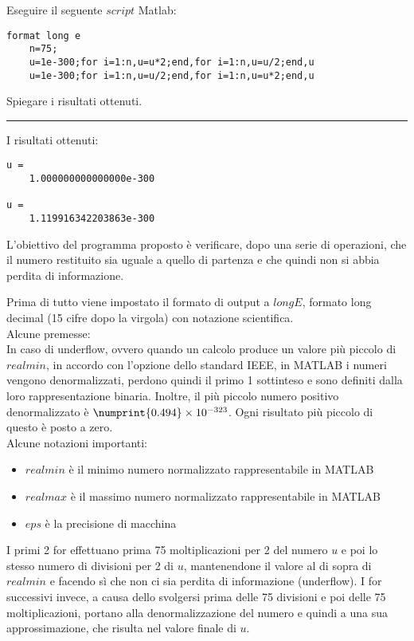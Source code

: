 Eseguire il seguente $script$ Matlab:
\begin{lstlisting}[caption = {}]
	format long e
	n=75;
	u=1e-300;for i=1:n,u=u*2;end,for i=1:n,u=u/2;end,u
	u=1e-300;for i=1:n,u=u/2;end,for i=1:n,u=u*2;end,u
\end{lstlisting}
Spiegare i risultati ottenuti.

\hspace{1cm}
\par\noindent\rule{\textwidth}{0.4pt}
\hspace{1cm}

I risultati ottenuti:
\begin{lstlisting}[caption = {}]
u = 
	1.000000000000000e-300

u = 
	1.119916342203863e-300
\end{lstlisting}

L'obiettivo del programma proposto è verificare, dopo una serie di operazioni, che il numero restituito sia uguale a quello di partenza e
che quindi non si abbia perdita di informazione.

Prima di tutto viene impostato il formato di output a $longE$, formato long decimal (15 cifre dopo la virgola) con notazione scientifica.\\

Alcune premesse:\\
In caso di underflow, ovvero quando un calcolo produce un valore più piccolo di $realmin$, in accordo con l’opzione dello standard IEEE, 
in MATLAB i numeri vengono denormalizzati, perdono quindi il primo 1 sottinteso e sono definiti dalla loro rappresentazione binaria.
Inoltre, il più piccolo numero positivo denormalizzato è $\numprint{0.494}\times10^{-323}$. Ogni risultato più piccolo di questo è posto a zero.\\

Alcune notazioni importanti:
\begin{itemize}
	\item $realmin$ è il minimo numero normalizzato rappresentabile in MATLAB
	\item $realmax$ è il massimo numero normalizzato rappresentabile in MATLAB
	\item $eps$ è la precisione di macchina
\end{itemize}

I primi 2 for effettuano prima 75 moltiplicazioni per 2 del numero $u$ e poi lo stesso numero di divisioni per 2 di $u$, 
mantenendone il valore al di sopra di $realmin$ e facendo sì che non ci sia perdita di informazione (underflow).
I for successivi invece, a causa dello svolgersi prima delle 75 divisioni e poi delle 75 moltiplicazioni, portano alla denormalizzazione del numero e
quindi a una sua approssimazione, che risulta nel valore finale di $u$.
